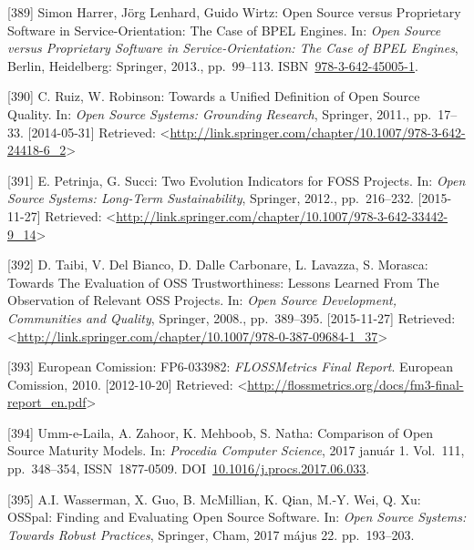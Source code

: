 \documentclass[12pt,magyar,a4paper,oneside]{scrreprt}
\newenvironment{cslreferences}%
  {}%
  {\par}
\begin{document}
\begin{cslreferences}
\leavevmode\hypertarget{ref-simon_harrer_open_2013}{}%
{[}389{]} Simon Harrer, Jörg Lenhard, Guido Wirtz: Open Source versus
Proprietary Software in Service-Orientation: The Case of BPEL Engines.
In: \emph{Open Source versus Proprietary Software in
Service-Orientation: The Case of BPEL Engines}, Berlin, Heidelberg:
Springer, 2013., pp.~99--113.
ISBN~\href{https://worldcat.org/isbn/978-3-642-45005-1}{978-3-642-45005-1}.

\leavevmode\hypertarget{ref-ruiz_towards_2011}{}%
{[}390{]} C. Ruiz, W. Robinson: Towards a Unified Definition of Open
Source Quality. In: \emph{Open Source Systems: Grounding Research},
Springer, 2011., pp.~17--33. {[}2014-05-31{]} Retrieved:
\textless{}\url{http://link.springer.com/chapter/10.1007/978-3-642-24418-6_2}\textgreater{}

\leavevmode\hypertarget{ref-petrinja_two_2012}{}%
{[}391{]} E. Petrinja, G. Succi: Two Evolution Indicators for FOSS
Projects. In: \emph{Open Source Systems: Long-Term Sustainability},
Springer, 2012., pp.~216--232. {[}2015-11-27{]} Retrieved:
\textless{}\url{http://link.springer.com/chapter/10.1007/978-3-642-33442-9_14}\textgreater{}

\leavevmode\hypertarget{ref-taibi_towards_2008}{}%
{[}392{]} D. Taibi, V. Del Bianco, D. Dalle Carbonare, L. Lavazza, S.
Morasca: Towards The Evaluation of OSS Trustworthiness: Lessons Learned
From The Observation of Relevant OSS Projects. In: \emph{Open Source
Development, Communities and Quality}, Springer, 2008., pp.~389--395.
{[}2015-11-27{]} Retrieved:
\textless{}\url{http://link.springer.com/chapter/10.1007/978-0-387-09684-1_37}\textgreater{}

\leavevmode\hypertarget{ref-european_comission_flossmetrics_2010}{}%
{[}393{]} European Comission: FP6-033982: \emph{FLOSSMetrics Final
Report}. European Comission, 2010. {[}2012-10-20{]} Retrieved:
\textless{}\url{http://flossmetrics.org/docs/fm3-final-report_en.pdf}\textgreater{}

\leavevmode\hypertarget{ref-umm-e-laila_comparison_2017}{}%
{[}394{]} Umm-e-Laila, A. Zahoor, K. Mehboob, S. Natha: Comparison of
Open Source Maturity Models. In: \emph{Procedia Computer Science}, 2017
január 1. Vol.~111, pp.~348--354, ISSN~1877-0509.
DOI~\href{https://doi.org/10.1016/j.procs.2017.06.033}{10.1016/j.procs.2017.06.033}.

\leavevmode\hypertarget{ref-wasserman_osspal_2017}{}%
{[}395{]} A.I. Wasserman, X. Guo, B. McMillian, K. Qian, M.-Y. Wei, Q.
Xu: OSSpal: Finding and Evaluating Open Source Software. In: \emph{Open
Source Systems: Towards Robust Practices}, Springer, Cham, 2017 május
22. pp.~193--203.


\end{cslreferences}
\end{document}

